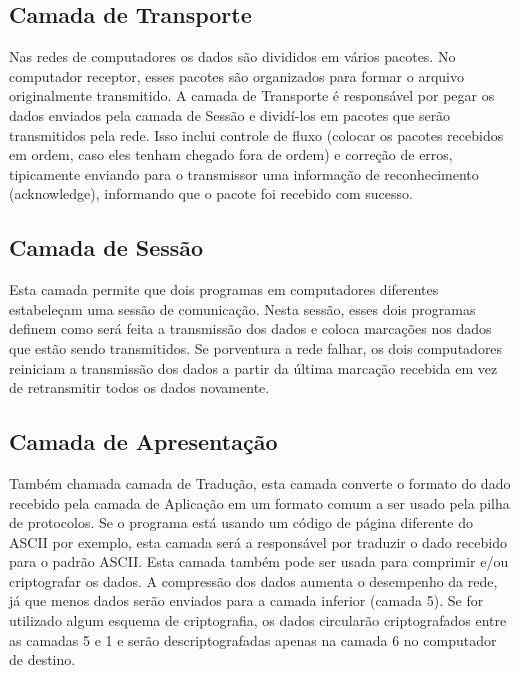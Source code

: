 \subsection{Camada de Transporte}

Nas redes de computadores os dados são divididos em vários pacotes. No computador receptor, esses pacotes são organizados para formar o arquivo originalmente transmitido. A camada de Transporte é responsável por pegar os dados enviados pela camada de Sessão e dividí-los em pacotes que serão transmitidos pela rede. Isso inclui controle de fluxo (colocar os pacotes recebidos em ordem, caso eles tenham chegado fora de ordem) e correção de erros, tipicamente enviando para o transmissor uma informação de reconhecimento (acknowledge), informando que o pacote foi recebido com sucesso.


\subsection{Camada de Sessão}

Esta camada permite que dois programas em computadores diferentes estabeleçam uma sessão de comunicação. Nesta sessão, esses dois programas definem como será feita a transmissão dos dados e coloca marcações nos dados que estão sendo transmitidos. Se porventura a rede falhar, os dois computadores reiniciam a transmissão dos dados a partir da última marcação recebida em vez de retransmitir todos os dados novamente.


\subsection{Camada de Apresentação}

Também chamada camada de Tradução, esta camada converte o formato do dado recebido pela camada de Aplicação em um formato comum a ser usado pela pilha de protocolos. Se o programa está usando um código de página diferente do ASCII por exemplo, esta camada será a responsável por traduzir o dado recebido para o padrão ASCII. Esta camada também pode ser usada para comprimir e/ou criptografar os dados. A compressão dos dados aumenta o desempenho da rede, já que menos dados serão enviados para a camada inferior (camada 5). Se for utilizado algum esquema de criptografia, os dados circularão criptografados entre as camadas 5 e 1 e serão descriptografadas apenas na camada 6 no computador de destino.

